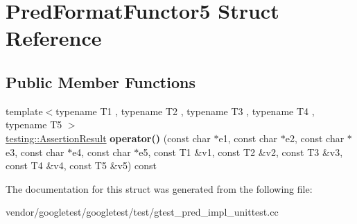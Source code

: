 \hypertarget{struct_pred_format_functor5}{}\section{Pred\+Format\+Functor5 Struct Reference}
\label{struct_pred_format_functor5}
\subsection*{Public Member Functions}
\begin{DoxyCompactItemize}
\item 
\mbox{\label{struct_pred_format_functor5_a0fe9e8e9ae614ea577cf1b34e9cfde58}} 
{\footnotesize template$<$typename T1 , typename T2 , typename T3 , typename T4 , typename T5 $>$ }\\\hyperlink{classtesting_1_1_assertion_result}{testing\+::\+Assertion\+Result} {\bfseries operator()} (const char $\ast$e1, const char $\ast$e2, const char $\ast$e3, const char $\ast$e4, const char $\ast$e5, const T1 \&v1, const T2 \&v2, const T3 \&v3, const T4 \&v4, const T5 \&v5) const
\end{DoxyCompactItemize}


The documentation for this struct was generated from the following file\+:\begin{DoxyCompactItemize}
\item 
vendor/googletest/googletest/test/gtest\+\_\+pred\+\_\+impl\+\_\+unittest.\+cc\end{DoxyCompactItemize}
